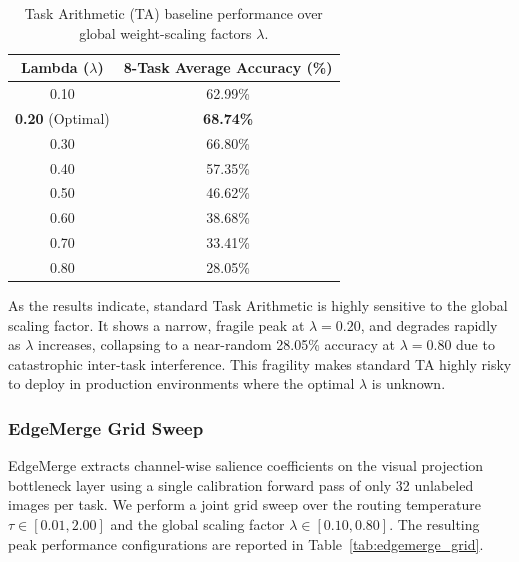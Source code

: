 \begin{table}[t]
\caption{Task Arithmetic (TA) baseline performance over global weight-scaling factors $\lambda$.}
\label{tab:ta_grid}
\vskip 0.15in
\begin{center}
\begin{small}
\begin{sc}
\begin{tabular}{cc}
\toprule
Lambda ($\lambda$) & 8-Task Average Accuracy (\%) \\
\midrule
0.10 & 62.99\% \\
\textbf{0.20} (Optimal) & \textbf{68.74\%} \\
0.30 & 66.80\% \\
0.40 & 57.35\% \\
0.50 & 46.62\% \\
0.60 & 38.68\% \\
0.70 & 33.41\% \\
0.80 & 28.05\% \\
\bottomrule
\end{tabular}
\end{sc}
\end{small}
\end{center}
\vskip -0.1in
\end{table}

As the results indicate, standard Task Arithmetic is highly sensitive to the global scaling factor. It shows a narrow, fragile peak at $\lambda = 0.20$, and degrades rapidly as $\lambda$ increases, collapsing to a near-random 28.05\% accuracy at $\lambda = 0.80$ due to catastrophic inter-task interference. This fragility makes standard TA highly risky to deploy in production environments where the optimal $\lambda$ is unknown.

\subsubsection{EdgeMerge Grid Sweep}
EdgeMerge extracts channel-wise salience coefficients on the visual projection bottleneck layer using a single calibration forward pass of only 32 unlabeled images per task. We perform a joint grid sweep over the routing temperature $\tau \in [0.01, 2.00]$ and the global scaling factor $\lambda \in [0.10, 0.80]$. The resulting peak performance configurations are reported in Table~\ref{tab:edgemerge_grid}.

